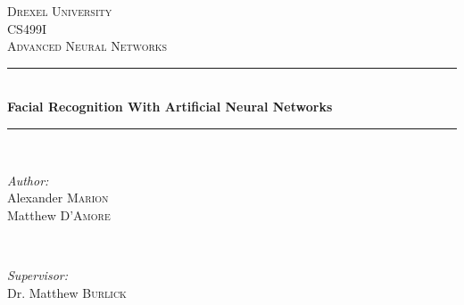 \documentclass[12pt]{article}
\begin{document}
\begin{titlepage}

\newcommand{\HRule}{\rule{\linewidth}{0.5mm}} %

\center %


\textsc{\LARGE Drexel University}\\[1.5cm] %
\textsc{\Large CS499I}\\[0.5cm] %
\textsc{\large Advanced Neural Networks}\\[0.5cm] %


\HRule \\[0.4cm]
{ \huge \bfseries Facial Recognition With Artificial Neural Networks}\\[0.4cm] %
\HRule \\[1.5cm]


\begin{minipage}{0.4\textwidth}
\begin{flushleft} \large
\emph{Author:}\\
Alexander \textsc{Marion}\\
Matthew \textsc{D'Amore}
\end{flushleft}
\end{minipage}
~
\begin{minipage}{0.4\textwidth}
\begin{flushright} \large
\emph{Supervisor:} \\
Dr. Matthew \textsc{Burlick}
\end{flushright}
\end{minipage}\\[4cm]



\end{titlepage}
\end{document}
